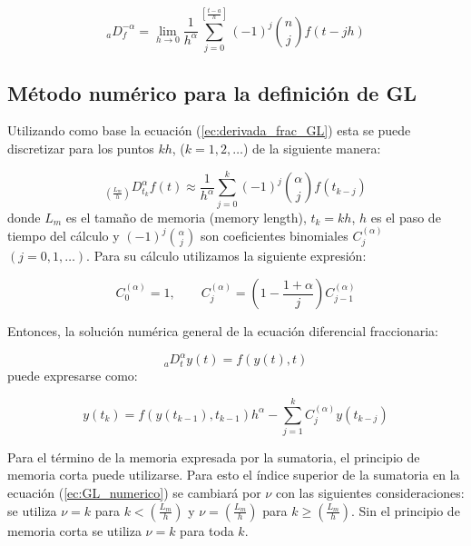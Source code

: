 	\begin{equation}
		_{a}D_{f}^{-\alpha} = \lim_{h \to 0 } \frac{1}{h^{\alpha}} \sum_{j = 0}^{\left[ \frac{t-a}{h}  \right]} (-1)^{j} \binom{n}{j} f(t - jh)
	\end{equation}

		\subsection{Método numérico para la definición de GL}
		
	Utilizando como base la ecuación (\ref{ec:derivada_frac_GL}) esta se puede discretizar para los puntos $kh$, ($k = 1,2,\ldots$) de la siguiente manera:
			
	\begin{equation}
		_{\left( \frac{L_{m}}{h} \right)} D^{\alpha}_{t_{k}} f(t) \approx \frac{1}{h^{\alpha}} \sum_{j=0}^{k}(-1)^{j}  \binom{\alpha}{j} f(t_{k-j})
	\end{equation}
	donde $L_{m}$ es el tamaño de memoria (memory length), $t_{k} = kh$, $h$ es el paso de tiempo del cálculo y $(-1)^{j}\binom{\alpha}{j}$ son coeficientes binomiales $C_{j}^{(\alpha)}$ $(j=0,1,\ldots)$. Para su cálculo utilizamos la siguiente expresión:
		
	\begin{equation}
		C_{0}^{(\alpha)} = 1, \qquad  C_{j}^{(\alpha)} = \left( 1 - \frac{1 + \alpha}{j} \right) C_{j-1}^{(\alpha)}
	\end{equation}
			
	Entonces, la solución numérica general de la ecuación diferencial fraccionaria:
		
	\begin{equation}
	 	_{a}D^{\alpha}_{t} y(t) = f(y(t), t)
	\end{equation}
	puede expresarse como:
		
	\begin{equation}
		y(t_{k}) = f(y(t_{k-1}), t_{k-1}) h^{\alpha} - \sum_{j=1}^{k} C_{j}^{(\alpha)} y(t_{k-j})
		\label{ec:GL_numerico}
	\end{equation}

	Para el término de la memoria expresada por la sumatoria, el principio de memoria corta puede utilizarse. Para esto el índice superior de la sumatoria en la ecuación (\ref{ec:GL_numerico}) se cambiará por $\nu$ con las siguientes consideraciones: se utiliza $\nu = k$ para $k < \left( \frac{L_{m}}{h} \right)$ y $\nu = \left( \frac{L_{m}}{h} \right)$ para $k \geq (\frac{L_{m}}{h})$. Sin el principio de memoria corta se utiliza $\nu = k$ para toda $k$. 
	
